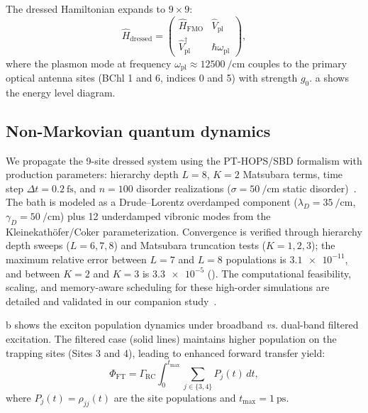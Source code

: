 \documentclass[onecolumn,a4paper,12pt]{article}
\begin{document}
The dressed Hamiltonian expands to $9\times 9$:
\begin{equation}
\hat{H}_{\mathrm{dressed}} = 
\begin{pmatrix}
\hat{H}_{\mathrm{FMO}} & \hat{V}_{\mathrm{pl}} \\
\hat{V}_{\mathrm{pl}}^{\dagger} & \hbar\omega_{\mathrm{pl}}
\end{pmatrix},
\label{eq:dressed_hamiltonian}
\end{equation}
where the plasmon mode at frequency $\omega_{\mathrm{pl}} \approx \qty{12500}{\per\cm}$ couples to the primary optical antenna sites (BChl 1 and 6, indices 0 and 5) with strength $g_0$.
a shows the energy level diagram.

\subsection*{Non-Markovian quantum dynamics}

We propagate the 9-site dressed system using the PT-HOPS/SBD formalism with production parameters: hierarchy depth $L=8$, $K=2$ Matsubara terms, time step $\Delta t = \qty{0.2}{\fs}$, and $n=100$ disorder realizations ($\sigma = \qty{50}{\per\cm}$ static disorder)~\cite{Varvelo2021,Citty2024}.
The bath is modeled as a Drude--Lorentz overdamped component ($\lambda_D = \qty{35}{\per\cm}$, $\gamma_D = \qty{50}{\per\cm}$) plus 12 underdamped vibronic modes from the Kleinekath\"{o}fer/Coker parameterization.
Convergence is verified through hierarchy depth sweeps ($L=6,7,8$) and Matsubara truncation tests ($K=1,2,3$); the maximum relative error between $L=7$ and $L=8$ populations is $\num{3.1e-11}$, and between $K=2$ and $K=3$ is $\num{3.3e-5}$ (). The computational feasibility, scaling, and memory-aware scheduling for these high-order simulations are detailed and validated in our companion study~\cite{Kouam2026}.

b shows the exciton population dynamics under broadband \emph{vs.} dual-band filtered excitation.
The filtered case (solid lines) maintains higher population on the trapping sites (Sites 3 and 4), leading to enhanced forward transfer yield:
\begin{equation}
\Phi_{\mathrm{FT}} = \Gamma_{\mathrm{RC}} \int_0^{t_{\mathrm{max}}} \sum_{j \in \{3,4\}} P_j(t)\,dt,
\label{eq:phi_ft}
\end{equation}
where $P_j(t) = \rho_{jj}(t)$ are the site populations and $t_{\mathrm{max}} = \qty{1}{\ps}$.
\end{document}
